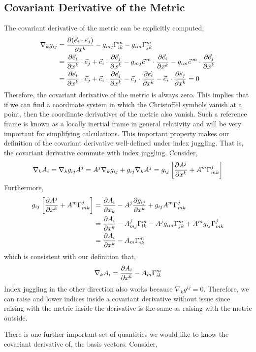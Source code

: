 \documentclass[11pt, a4paper]{article}
\begin{document}
\subsection{Covariant Derivative of the Metric}
The covariant derivative of the metric can be explicitly computed,
\begin{align*}
\nabla_kg_{ij} &= \frac{\partial{(\vec{e}_i\cdot \vec{e}_j)}}{\partial{x^k}} - g_{mj} \Gamma^m_{ik} - g_{im} \Gamma^m_{jk}
\\
& = \frac{\partial{\vec{e}_i}}{\partial{x^k}}\cdot \vec{e}_j  + \vec{e}_i\cdot \frac{\partial{\vec{e}_j}}{\partial{x^k}} - g_{mj} \vec{e}^{\, m} \cdot \frac{\partial{\vec{e}_i}}{\partial{x^k}} - g_{im} \vec{e}^{\, m} \cdot \frac{\partial{\vec{e}_j}}{\partial{x^k}} 
\\
& = \frac{\partial{\vec{e}_i}}{\partial{x^k}}\cdot \vec{e}_j  + \vec{e}_i\cdot \frac{\partial{\vec{e}_j}}{\partial{x^k}} - \vec{e}_j \cdot \frac{\partial{\vec{e}_i}}{\partial{x^k}} - \vec{e}_i \cdot \frac{\partial{\vec{e}_j}}{\partial{x^k}} = 0 
\end{align*}
Therefore, the covariant derivative of the metric is always zero. This implies that if we can find a coordinate system in which the Christoffel symbols vanish at a point, then the coordinate derivatives of the metric also vanish. Such a reference frame is known as a locally inertial frame in general relativity and will be very important for simplifying calculations. 
This important property makes our definition of the covariant derivative well-defined under index juggling. That is, the covariant derivative commute with index juggling. Consider,
\[\nabla_k A_i = \nabla_kg_{ij}A^j = A^j\nabla_kg_{ij}+g_{ij}\nabla_kA^j = g_{ij}\left[\frac{\partial{A^j}}{\partial{x^k}} + A^m\Gamma^j_{mk}\right] \]
Furthermore, 
\begin{align*}
g_{ij}\left[\frac{\partial{A^j}}{\partial{x^k}} + A^m\Gamma^j_{mk}\right] & = \frac{\partial{A_i}}{\partial{x_k}}-A^j\frac{\partial{g_{ij}}}{\partial{x^k}} + g_{ij}A^m\Gamma^j_{mk}
\\
& =  \frac{\partial{A_i}}{\partial{x^k}} - A^j_{mj}\Gamma^m_{lk} - A^jg_{im}\Gamma^m_{jk} + A^mg_{ij}\Gamma^j_{mk}
\\
& = \frac{\partial{A_i}}{\partial{x^k}} - A_m\Gamma^m_{ik}
\end{align*}
which is consistent with our definition that,
 \[ \nabla_kA_i = \frac{\partial{A_i}}{\partial{x^k}} - A_m\Gamma^m_{ik}\]
Index juggling in the other direction also works because $\nabla_kg^{ij} = 0$. Therefore,  we can raise and lower indices inside a covariant derivative without issue since raising with the metric inside the derivative is the same as raising with the metric outside. 
\par
There is one further important set of quantities we would like to know the covariant derivative of, the basis vectors. Consider,
\end{document}
